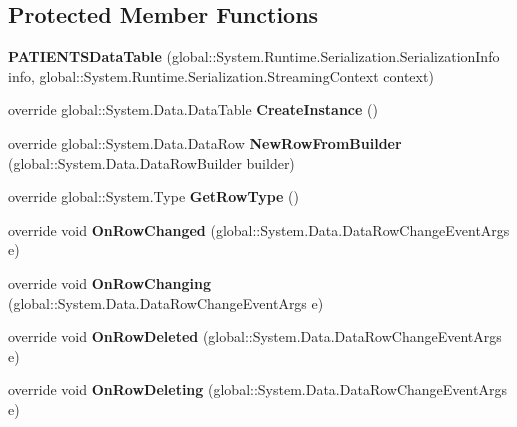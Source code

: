 \subsection*{Protected Member Functions}
\begin{CompactItemize}
\item 
\textbf{PATIENTSDataTable} (global::System.Runtime.Serialization.SerializationInfo info, global::System.Runtime.Serialization.StreamingContext context)\label{class_automatic_medical_system_1_1_data_set1_1_1_p_a_t_i_e_n_t_s_data_table_4884a141bfaa851cb8242bfe019e923d}

\item 
override global::System.Data.DataTable \textbf{CreateInstance} ()\label{class_automatic_medical_system_1_1_data_set1_1_1_p_a_t_i_e_n_t_s_data_table_8e232fef54758bb1c8648a98fb384a51}

\item 
override global::System.Data.DataRow \textbf{NewRowFromBuilder} (global::System.Data.DataRowBuilder builder)\label{class_automatic_medical_system_1_1_data_set1_1_1_p_a_t_i_e_n_t_s_data_table_d0c11853a265928850b2aef5e3ac9a44}

\item 
override global::System.Type \textbf{GetRowType} ()\label{class_automatic_medical_system_1_1_data_set1_1_1_p_a_t_i_e_n_t_s_data_table_22a0e01d7c0f70a0247c85b130e71cde}

\item 
override void \textbf{OnRowChanged} (global::System.Data.DataRowChangeEventArgs e)\label{class_automatic_medical_system_1_1_data_set1_1_1_p_a_t_i_e_n_t_s_data_table_e46b999f088caf2d4182bb0d83e92006}

\item 
override void \textbf{OnRowChanging} (global::System.Data.DataRowChangeEventArgs e)\label{class_automatic_medical_system_1_1_data_set1_1_1_p_a_t_i_e_n_t_s_data_table_25b2ee852353038f8fb03118abc4397f}

\item 
override void \textbf{OnRowDeleted} (global::System.Data.DataRowChangeEventArgs e)\label{class_automatic_medical_system_1_1_data_set1_1_1_p_a_t_i_e_n_t_s_data_table_063fb6d91269173d8aa36b4681848943}

\item 
override void \textbf{OnRowDeleting} (global::System.Data.DataRowChangeEventArgs e)\label{class_automatic_medical_system_1_1_data_set1_1_1_p_a_t_i_e_n_t_s_data_table_39a16ed4d5da176e300c8eb0c7b15de6}

\end{CompactItemize}
